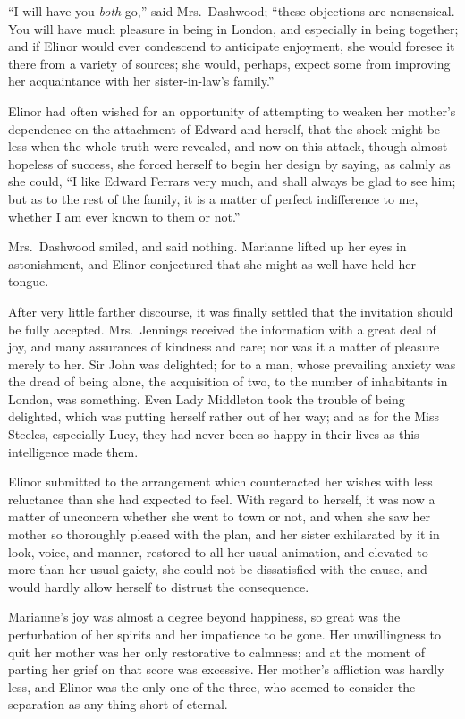 \documentclass{article}
\begin{document}
``I will have you \emph{both} go,'' said Mrs.\ Dashwood;
``these objections are nonsensical.  You will have much
pleasure in being in London, and especially in being together;
and if Elinor would ever condescend to anticipate enjoyment,
she would foresee it there from a variety of sources;
she would, perhaps, expect some from improving her
acquaintance with her sister-in-law's family.''

Elinor had often wished for an opportunity of
attempting to weaken her mother's dependence on the
attachment of Edward and herself, that the shock might
be less when the whole truth were revealed, and now
on this attack, though almost hopeless of success,
she forced herself to begin her design by saying,
as calmly as she could, ``I like Edward Ferrars very much,
and shall always be glad to see him; but as to the rest
of the family, it is a matter of perfect indifference
to me, whether I am ever known to them or not.''

Mrs.\ Dashwood smiled, and said nothing.
Marianne lifted up her eyes in astonishment, and Elinor
conjectured that she might as well have held her tongue.

After very little farther discourse, it was finally
settled that the invitation should be fully accepted.
Mrs.\ Jennings received the information with a great
deal of joy, and many assurances of kindness and care;
nor was it a matter of pleasure merely to her.  Sir John
was delighted; for to a man, whose prevailing anxiety
was the dread of being alone, the acquisition of two,
to the number of inhabitants in London, was something.
Even Lady Middleton took the trouble of being delighted,
which was putting herself rather out of her way;
and as for the Miss Steeles, especially Lucy, they had
never been so happy in their lives as this intelligence
made them.

Elinor submitted to the arrangement which counteracted
her wishes with less reluctance than she had expected
to feel.  With regard to herself, it was now a matter
of unconcern whether she went to town or not, and when
she saw her mother so thoroughly pleased with the plan,
and her sister exhilarated by it in look, voice, and manner,
restored to all her usual animation, and elevated to more
than her usual gaiety, she could not be dissatisfied
with the cause, and would hardly allow herself to distrust
the consequence.

Marianne's joy was almost a degree beyond happiness,
so great was the perturbation of her spirits and her
impatience to be gone.  Her unwillingness to quit her
mother was her only restorative to calmness; and at the
moment of parting her grief on that score was excessive.
Her mother's affliction was hardly less, and Elinor
was the only one of the three, who seemed to consider
the separation as any thing short of eternal.
\end{document}
